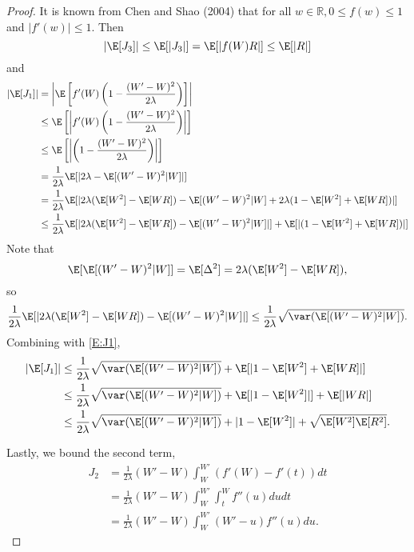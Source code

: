 \begin{proof}
  It is known from Chen and Shao (2004) that for all $w \in \mathbb{R}, 0 \leq f(w) \leq 1$ and
  $|f'(w)| \leq 1$.  Then
  \begin{equation}
    |\E [J_3]| \leq \E [|J_3|] = \E [|f(W)R|] \leq \E [|R|]
  \end{equation}
  and
  \begin{equation}
    \label{E:J1}
    \begin{split}
      |\E [J_1] | &= \left | \E \left [f'(W)\left (1-\frac{(W'-W)^2}{2\lambda} \right ) \right ]
      \right | \\
      &\leq \E \left [\left | f'(W)\left (1-\frac{(W'-W)^2}{2\lambda} \right ) \right | \right ] \\
      &\leq \E \left [ \left | \left (1-\frac{(W'-W)^2}{2\lambda} \right )  \right | \right ] \\
      &= \frac{1}{2\lambda} \E [|2\lambda - \E [(W'-W)^2|W]|] \\
      &= \frac{1}{2\lambda} \E [|2\lambda (\E [W^2] - \E [WR]) - \E [(W'-W)^2|W] + 
      2\lambda (1 - \E [W^2] + \E [WR])|] \\
      &\leq \frac{1}{2\lambda} \E [|2\lambda (\E [W^2] - \E [WR]) - \E [(W'-W)^2|W]|] + 
      \E [|(1 - \E [W^2] + \E [WR])|]
    \end{split}
  \end{equation}
  Note that 
  \begin{equation}
    \E [\E [(W'-W)^2|W]] = \E [\Delta^2] = 2 \lambda (\E [W^2] - \E [WR]),
  \end{equation}
  so
  \begin{equation}
    \frac{1}{2\lambda} \E [|2\lambda (\E [W^2] - \E [WR]) - \E [(W'-W)^2|W]|] \leq
    \frac{1}{2\lambda} \sqrt{\var (\E [(W'-W)^2|W])}.
  \end{equation}
  Combining with \eqref{E:J1},
  \begin{equation}
    \begin{split}
      |\E [J_1] | &\leq \frac{1}{2\lambda} \sqrt{\var (\E [(W'-W)^2|W])} +
      \E [|1 - \E [W^2] + \E [WR]|] \\
      &\leq \frac{1}{2\lambda} \sqrt{\var (\E [(W'-W)^2|W])} + \E [|1 - \E [W^2]|] + \E [|WR|] \\
      &\leq \frac{1}{2\lambda} \sqrt{\var (\E [(W'-W)^2|W])} + |1 - \E [W^2]| + 
      \sqrt{\E [W^2]\E [R^2]}.
    \end{split}
  \end{equation}
  
  Lastly, we bound the second term, 
  \begin{equation}
    \begin{split}
      J_2 &= \frac{1}{2 \lambda}(W'-W)\int_W^{W'} (f'(W)-f'(t)) dt \\
      &= \frac{1}{2 \lambda}(W'-W)\int_W^{W'}\int_t^Wf''(u) du dt \\
      &= \frac{1}{2 \lambda}(W'-W)\int_W^{W'} (W'-u)f''(u) du.
    \end{split}
  \end{equation}


\end{proof}
